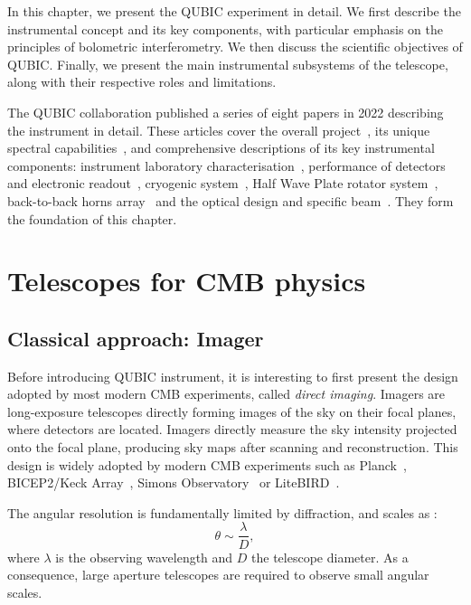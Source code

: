 \documentclass[../../thesis.tex]{subfiles}
\begin{document}
In this chapter, we present the QUBIC experiment in detail. We first describe the instrumental concept and its key components, with particular emphasis on the principles of bolometric interferometry. We then discuss the scientific objectives of QUBIC. Finally, we present the main instrumental subsystems of the telescope, along with their respective roles and limitations.

The QUBIC collaboration published a series of eight papers in 2022 describing the instrument in detail. These articles cover the overall project~\cite{QUBICI}, its unique spectral capabilities~\cite{QUBICII}, and comprehensive descriptions of its key instrumental components: instrument laboratory characterisation~\cite{QUBICIII}, performance of detectors and electronic readout~\cite{QUBICIV}, cryogenic system~\cite{QUBICV}, Half Wave Plate rotator system~\cite{QUBICVI}, back-to-back horns array~\cite{QUBICVII} and the optical design and specific beam~\cite{QUBICVIII}. They form the foundation of this chapter.

\section{Telescopes for CMB physics}

\subsection{Classical approach: Imager}

Before introducing QUBIC instrument, it is interesting to first present the design adopted by most modern CMB experiments, called \emph{direct imaging}. Imagers are long-exposure telescopes directly forming images of the sky on their focal planes, where detectors are located. Imagers directly measure the sky intensity projected onto the focal plane, producing sky maps after scanning and reconstruction. This design is widely adopted by modern CMB experiments such as Planck~\cite{PlanckDesign}, BICEP2/Keck Array~\cite{BicepDesign}, Simons Observatory~\cite{SODesign} or LiteBIRD~\cite{LiteBirdDesign}. 

The angular resolution is fundamentally limited by diffraction, and scales as :
\begin{equation}
    \theta \sim \frac{\lambda}{D},
\end{equation}
where $\lambda$ is the observing wavelength and $D$ the telescope diameter. As a consequence, large aperture telescopes are required to observe small angular scales.
\end{document}
